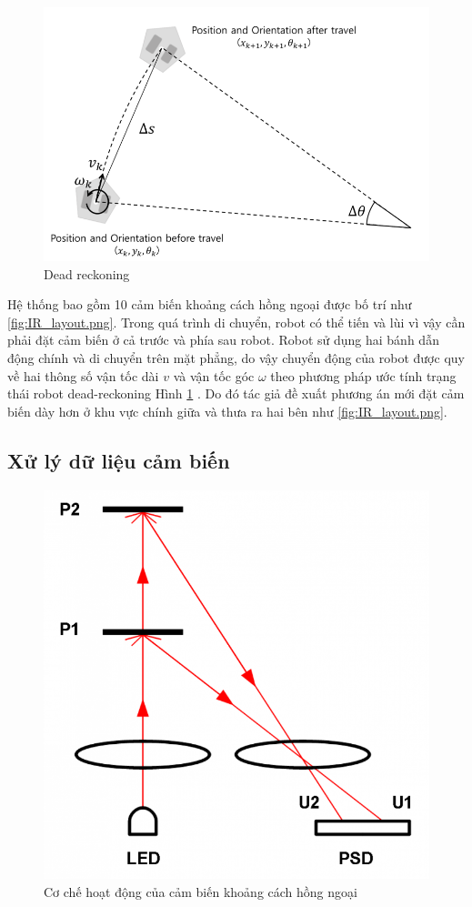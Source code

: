 \begin{figure}[htbp]
    \centering
    \includegraphics[width=0.7\linewidth]{figures/dead-reckoning.png}
    \caption{Dead reckoning \cite{pyo2017ros}}
    \label{fig:dead-reckoning}
\end{figure}

Hệ thống bao gồm 10 cảm biến khoảng cách hồng ngoại được bố trí như \figurename{ \ref{fig:IR_layout.png}}.
Trong quá trình di chuyển, robot có thể tiến và lùi vì vậy cần phải đặt cảm biến ở cả trước và phía sau robot.
Robot sử dụng hai bánh dẫn động chính và di chuyển trên mặt phẳng, do vậy chuyển động của robot được quy về hai thông số vận tốc dài $v$ và vận tốc góc $\omega$ theo phương pháp ước tính trạng thái robot dead-reckoning Hình \ref{fig:dead-reckoning} \cite{pyo2017ros}.
Do đó tác giả đề xuất phương án mới đặt cảm biến dày hơn ở khu vực chính giữa và thưa ra hai bên như \figurename{ \ref{fig:IR_layout.png}}.


\subsection{Xử lý dữ liệu cảm biến}

\begin{figure}[htbp]
    \centering
    \includegraphics[width=0.5\linewidth]{figures/sensor_ir_distance_principle.png}
    \caption{Cơ chế hoạt động của cảm biến khoảng cách hồng ngoại}
    \label{fig:sensor_ir_distance_principle}
\end{figure}

